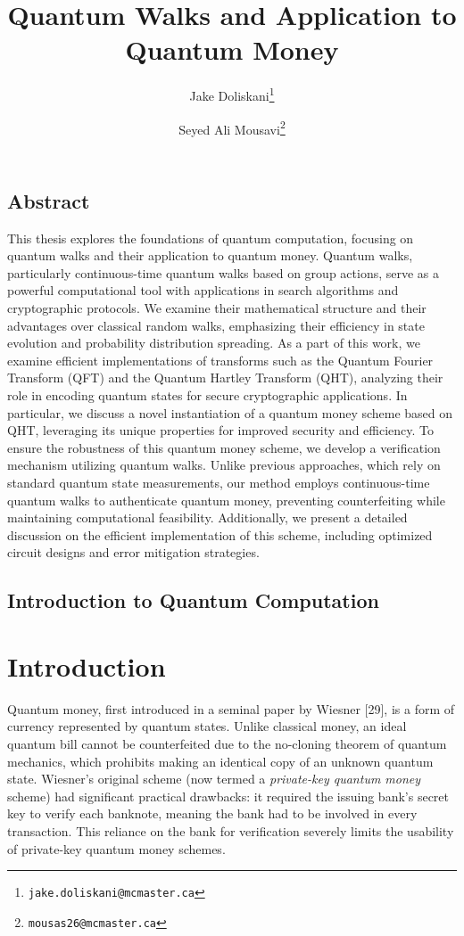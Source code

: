 \documentclass[11pt]{article}
\title{Quantum Walks and Application to Quantum Money}
\author{Jake Doliskani\thanks{\tt jake.doliskani@mcmaster.ca} }
\author{Seyed Ali Mousavi\thanks{\tt mousas26@mcmaster.ca} }
\affil{Department of Computing and Software, McMaster University}
\date{}
\theoremstyle{definition}
\begin{document}
\maketitle

\newpage
\section*{Abstract}

This thesis explores the foundations of quantum computation, focusing on quantum walks and their application to quantum money. Quantum walks, particularly continuous-time quantum walks based on group actions, serve as a powerful computational tool with applications in search algorithms and cryptographic protocols. We examine their mathematical structure and their advantages over classical random walks, emphasizing their efficiency in state evolution and probability distribution spreading. As a part of this work, we examine efficient implementations of transforms such as the Quantum Fourier Transform (QFT) and the Quantum Hartley Transform (QHT), analyzing their role in encoding quantum states for secure cryptographic applications. In particular, we discuss a novel instantiation of a quantum money scheme based on QHT, leveraging its unique properties for improved security and efficiency.
To ensure the robustness of this quantum money scheme, we develop a verification mechanism utilizing quantum walks. Unlike previous approaches, which rely on standard quantum state measurements, our method employs continuous-time quantum walks to authenticate quantum money, preventing counterfeiting while maintaining computational feasibility. Additionally, we present a detailed discussion on the efficient implementation of this scheme, including optimized circuit designs and error mitigation strategies.






\newpage
\section{Introduction to Quantum Computation}
\label{sec:intro}




\chapter{Introduction}
Quantum money, first introduced in a seminal paper by Wiesner [29], is a form of currency represented by quantum states. Unlike classical money, an ideal quantum bill cannot be counterfeited due to the no-cloning theorem of quantum mechanics, which prohibits making an identical copy of an unknown quantum state. Wiesner’s original scheme (now termed a \emph{private-key quantum money} scheme) had significant practical drawbacks: it required the issuing bank’s secret key to verify each banknote, meaning the bank had to be involved in every transaction. This reliance on the bank for verification severely limits the usability of private-key quantum money schemes.
\end{document}
